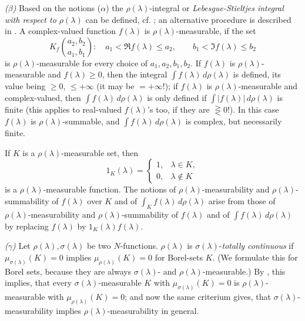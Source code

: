 \documentclass[b5paper,12pt,twoside]{article}
\numberwithin{equation}{section}
\theoremstyle{vnplain}
\theoremstyle{vndefinition}
\begin{document}
\noindent\textit{($\beta$)} Based on the notions ($\alpha$) the
$\rho(\lambda)$-integral or \emph{Lebesgue-Stieltjes integral with respect to
$\rho(\lambda)$} can be defined, cf. \cite[pp. 205--213]{ref11}; an
alternative procedure is described in \cite[pp. 198--202]{ref4}.
A complex-valued function $f(\lambda)$ is $\rho(\lambda)$-measurable, if the set
\[
K_f\binom{a_2,b_2}{a_1,b_1}:\quad
a_1<\Re f(\lambda)\leq a_2,\qquad b_1<\Im f(\lambda)\leq b_2
\]
is $\rho(\lambda)$-measurable for every choice of $a_1,a_2,b_1,b_2$. If
$f(\lambda)$ is $\rho(\lambda)$-measurable and $f(\lambda)\geq0$, then the
integral $\int f(\lambda)\,d\rho(\lambda)$ is defined, its value being
$\geq0$, $\leq+\infty$ (it may be $=+\infty$!); if $f(\lambda)$ is
$\rho(\lambda)$-measurable and complex-valued, then
$\int f(\lambda)\,d\rho(\lambda)$ is only defined if
$\int|f(\lambda)|\,d\rho(\lambda)$ is finite (this applies to real-valued
$f(\lambda)$'s too, if they are $\gtreqless0$!). In this case $f(\lambda)$ is
$\rho(\lambda)$-summable, and $\int f(\lambda)\,d\rho(\lambda)$ is complex,
but necessarily finite.

If $K$ is a $\rho(\lambda)$-measurable set, then
\[
1_K(\lambda)=
\begin{cases}
1,&\lambda\in K,\\
0,&\lambda\notin K
\end{cases}
\]
is a $\rho(\lambda)$-measurable function. The notions of
$\rho(\lambda)$-measurability and $\rho(\lambda)$-summability of $f(\lambda)$
over $K$ and of $\int_K f(\lambda)\,d\rho(\lambda)$ arise from those of
$\rho(\lambda)$-measurability and $\rho(\lambda)$-summability of $f(\lambda)$
and of $\int f(\lambda)\,d\rho(\lambda)$ by replacing $f(\lambda)$ by
$1_K(\lambda)f(\lambda)$.

\noindent\textit{($\gamma$)} Let $\rho(\lambda),\sigma(\lambda)$ be two
$N$-functions. $\rho(\lambda)$ is $\sigma(\lambda)$-\emph{totally continuous}
if $\mu_{\sigma(\lambda)}(K)=0$ implies
$\mu_{\rho(\lambda)}(K)=0$ for Borel-sets $K$. (We formulate this for Borel
sets, because they are always $\sigma(\lambda)$- and
$\rho(\lambda)$-measurable.) By \cite[p. 204, criterium (5)]{ref11}, this
implies, that every $\sigma(\lambda)$-measurable $K$ with
$\mu_{\sigma(\lambda)}(K)=0$ is $\rho(\lambda)$-measurable with
$\mu_{\rho(\lambda)}(K)=0$; and now the same criterium gives, that
$\sigma(\lambda)$-measurability implies $\rho(\lambda)$-measurability in
general.
\end{document}

